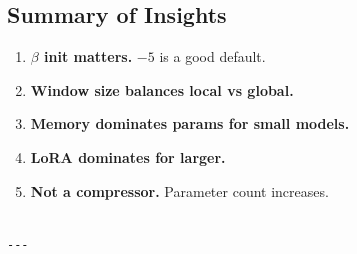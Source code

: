 \subsection{Summary of Insights}

\begin{enumerate}
\item \textbf{$\beta$ init matters.} $-5$ is a good default.
\item \textbf{Window size balances local vs global.}
\item \textbf{Memory dominates params for small models.}
\item \textbf{LoRA dominates for larger.}
\item \textbf{Not a compressor.} Parameter count increases.
\end{enumerate}
\begin{lstlisting}

---
\end{lstlisting}
